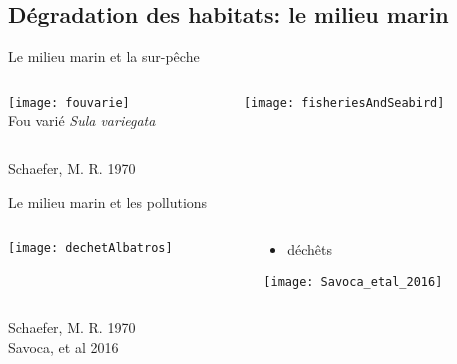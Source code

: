 \documentclass[10pt]{beamer}
\begin{document}
\subsection{Dégradation des habitats: le milieu marin}

\begin{frame}{Le milieu marin et la sur-pêche}
 \begin{columns}[c]
    \begin{column}[c]{0.5\textwidth}
      \begin{center}
     \texttt{[image: fouvarie]}\\
     Fou varié \textit{Sula variegata}
      \end{center}
    \end{column}
      \begin{column}[c]{0.5\textwidth}
      \begin{center}
   
    \texttt{[image: fisheriesAndSeabird]}
    \end{center}
    \end{column}
  \end{columns}
\footnotesize{Schaefer, M. R. 1970}
\end{frame}

\begin{frame}{Le milieu marin et les pollutions}
 \begin{columns}[c]
    \begin{column}[c]{0.5\textwidth}
      \begin{center}
     \texttt{[image: dechetAlbatros]}
          \end{center}
    \end{column}
    \begin{column}[c]{0.5\textwidth}
      \begin{itemize}
      \item déchêts
   
      \end{itemize}
      \vspace{20pt}
        \texttt{[image: Savoca\_etal\_2016]}
    \end{column}
  \end{columns}
  \begin{tiny}
        \vspace{10pt}
        Schaefer, M. R. 1970\\
        Savoca, et al 2016
  \end{tiny}

\footnotesize{}
\end{frame}
\end{document}
